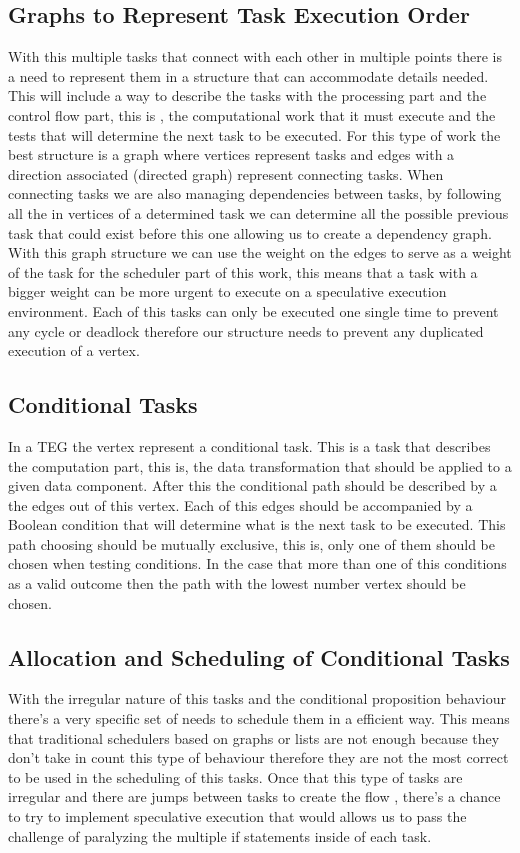 \subsection{Graphs to Represent Task Execution Order}
With this multiple tasks that connect with each other in multiple points there is a need to represent them in a structure that can accommodate details needed. 
This will include a way to describe the tasks with the processing part and the control flow part, this is , the computational work that it must execute and the tests that will determine the next task to be executed.
For this type of work the best structure is a graph where vertices represent tasks and edges with a direction associated (directed graph) represent connecting tasks.
When connecting tasks we are also managing dependencies between tasks, by following all the in vertices of a determined task we can determine all the possible previous task that could exist before this one allowing us to create a dependency graph.
With this graph structure we can use the weight on the edges to serve as a weight of the task for the scheduler part of this work, this means that a task with a bigger weight can be more urgent to execute on a speculative execution environment.
Each of this tasks can only be executed one single time to prevent any cycle or deadlock therefore our structure needs to prevent any duplicated execution of a vertex.

\subsection{Conditional Tasks}
In a TEG the vertex represent a conditional task. This is a task that describes the computation part, this is, the data transformation that should be applied to a given data component.
After this the conditional path should be described by a the edges out of this vertex. Each of this edges should be accompanied by a Boolean condition that will determine what is the next task to be executed.
This path choosing should be mutually exclusive, this is, only one of them should be chosen when testing conditions. In the case that more than one of this conditions as a valid outcome then the path with the lowest number vertex should be chosen.
\subsection{Allocation and Scheduling of Conditional Tasks}
With the irregular nature of this tasks and the conditional proposition behaviour there's a very specific set of needs to schedule them in a efficient way.
This means that traditional schedulers based on graphs or lists are not enough because they don't take in count this type of behaviour therefore they are not the most correct to be used in the scheduling of this tasks.
Once that this type of tasks are irregular and there are jumps between tasks to create the flow , there's a chance to try to implement speculative execution that would allows us to pass the challenge of paralyzing the multiple if statements inside of each task.


